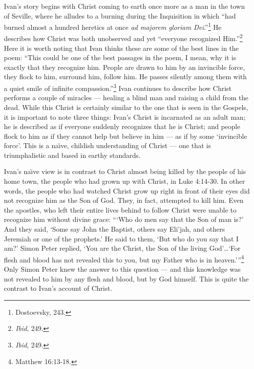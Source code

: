 Ivan's story begins with Christ coming to earth once more as a man in the town of Seville, where he alludes to a burning during the Inquisition in which ``had burned almost a hundred heretics at once \emph{ad majorem gloriam Dei}.''\footnote{Dostoevsky, 243.} He describes how Christ was both unobserved and yet ``everyone recognized Him.''\footnote{\emph{Ibid}, 249.} Here it is worth noting that Ivan thinks these are some of the best lines in the poem: ``This could be one of the best passages in the poem, I mean, why it is exactly that they recognize him. People are drawn to him by an invincible force, they flock to him, surround him, follow him. He passes silently among them with a quiet smile of infinite compassion.''\footnote{\emph{Ibid}, 249.} Ivan continues to describe how Christ performs a couple of miracles --- healing a blind man and raising a child from the dead. While this Christ is certainly similar to the one that is seen in the Gospels, it is important to note three things: Ivan's Christ is incarnated as an adult man; he is described as if everyone suddenly recognizes that he is Christ; and people flock to him as if they cannot help but believe in him --- as if by some `invincible force'. This is a na\"{\i}ve, childish understanding of Christ --- one that is triumphalistic and based in earthy standards. 

Ivan's na\"{\i}ve view is in contrast to Christ almost being killed by the people of his home town, the people who had grown up with Christ, in Luke 4:14-30. In other words, the people who had watched Christ grow up right in front of their eyes did not recognize him as the Son of God. They, in fact, attempted to kill him. Even the apostles, who left their entire lives behind to follow Christ were unable to recognize him without divine grace: ``\thinspace`Who do men say that the Son of man is?' And they said, `Some say John the Baptist, others say Eli'jah, and others Jeremiah or one of the prophets.' He said to them, `But who do you say that I am?' Simon Peter replied, `You are the Christ, the Son of the living God'\ldots `For flesh and blood has not revealed this to you, but my Father who is in heaven.'\thinspace''\footnote{Matthew 16:13-18.} Only Simon Peter knew the answer to this question --- and this knowledge was not revealed to him by any flesh and blood, but by God himself. This is quite the contrast to Ivan's account of Christ.


